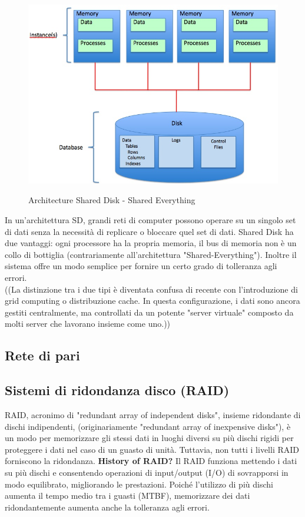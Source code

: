 \begin{figure}[htbp]
\centering
\includegraphics[scale=0.40]{img/Shared_Disk_Architecture.jpg}\\
\caption{Architecture Shared Disk - Shared Everything \label{figura1.2} \cite{etichetta7}}
\end{figure}

In un'architettura SD, grandi reti di computer possono operare su un singolo set di dati senza la necessit\`{a} di replicare o bloccare quel set di dati.\cite{etichetta7}
Shared Disk ha due vantaggi: ogni processore ha la propria memoria, il bus di memoria non \`{e} un collo di bottiglia (contrariamente all'architettura "Shared-Everything"). Inoltre il sistema offre un modo semplice per fornire un certo grado di tolleranza agli errori.\\

((La distinzione tra i due tipi \`{e} diventata confusa di recente con l'introduzione di grid computing o distribuzione cache. In questa configurazione, i dati sono ancora gestiti centralmente, ma controllati da un potente "server virtuale" composto da molti server che lavorano insieme come uno.\cite{etichetta2}))
\item
\subsection{Rete di pari}

\item
\subsection{Sistemi di ridondanza disco (RAID)}
RAID, acronimo di "redundant array of independent disks", insieme ridondante di dischi indipendenti, (originariamente "redundant array of inexpensive disks"), \`{e} un modo per memorizzare gli stessi dati in luoghi diversi su pi\`{u} dischi rigidi per proteggere i dati nel caso di un guasto di unit\`{a}. Tuttavia, non tutti i livelli RAID forniscono la ridondanza.
\textbf{History of RAID?}
Il RAID funziona mettendo i dati su pi\`{u} dischi e consentendo operazioni di input/output (I/O) di sovrapporsi in modo equilibrato, migliorando le prestazioni. Poich\'{e} l'utilizzo di pi\`{u} dischi aumenta il tempo medio tra i guasti (MTBF), memorizzare dei dati ridondantemente aumenta anche la tolleranza agli errori.
\item
